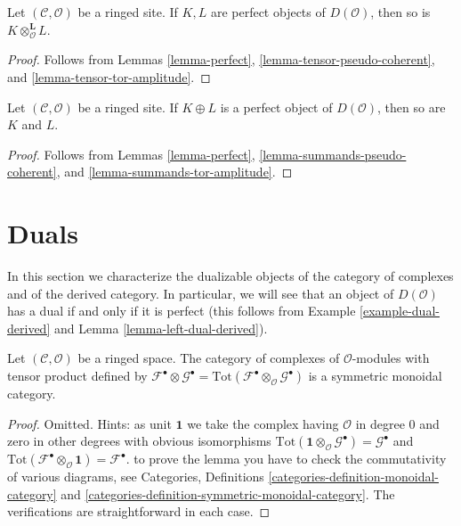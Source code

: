 \begin{lemma}
\label{lemma-tensor-perfect}
Let $(\mathcal{C}, \mathcal{O})$ be a ringed site.
If $K, L$ are perfect objects of $D(\mathcal{O})$, then
so is $K \otimes_\mathcal{O}^\mathbf{L} L$.
\end{lemma}

\begin{proof}
Follows from
Lemmas \ref{lemma-perfect}, \ref{lemma-tensor-pseudo-coherent}, and
\ref{lemma-tensor-tor-amplitude}.
\end{proof}

\begin{lemma}
\label{lemma-summands-perfect}
Let $(\mathcal{C}, \mathcal{O})$ be a ringed site.
If $K \oplus L$ is a perfect object of $D(\mathcal{O})$, then
so are $K$ and $L$.
\end{lemma}

\begin{proof}
Follows from
Lemmas \ref{lemma-perfect}, \ref{lemma-summands-pseudo-coherent}, and
\ref{lemma-summands-tor-amplitude}.
\end{proof}














\section{Duals}
\label{section-duals}

\noindent
In this section we characterize the dualizable objects of
the category of complexes and of the derived category.
In particular, we will see that an object of $D(\mathcal{O})$
has a dual if and only if it is perfect (this follows from
Example \ref{example-dual-derived} and
Lemma \ref{lemma-left-dual-derived}).

\begin{lemma}
\label{lemma-symmetric-monoidal-cat-complexes}
Let $(\mathcal{C}, \mathcal{O})$ be a ringed space. The category of complexes
of $\mathcal{O}$-modules with tensor product defined by
$\mathcal{F}^\bullet \otimes \mathcal{G}^\bullet =
\text{Tot}(\mathcal{F}^\bullet \otimes_\mathcal{O} \mathcal{G}^\bullet)$
is a symmetric monoidal category.
\end{lemma}

\begin{proof}
Omitted. Hints: as unit $\mathbf{1}$ we take the complex having
$\mathcal{O}$ in degree $0$ and zero in other degrees with
obvious isomorphisms
$\text{Tot}(\mathbf{1} \otimes_\mathcal{O} \mathcal{G}^\bullet) =
\mathcal{G}^\bullet$ and
$\text{Tot}(\mathcal{F}^\bullet \otimes_\mathcal{O} \mathbf{1}) =
\mathcal{F}^\bullet$.
to prove the lemma you have to check the commutativity
of various diagrams, see Categories, Definitions
\ref{categories-definition-monoidal-category} and
\ref{categories-definition-symmetric-monoidal-category}.
The verifications are straightforward in each case.
\end{proof}

